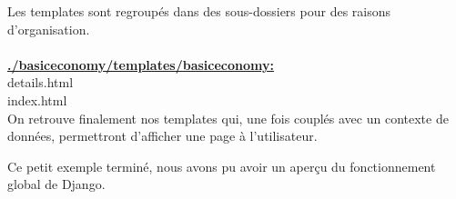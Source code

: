 Les templates sont regroupés dans des sous-dossiers pour des raisons d'organisation.
\\
\\
\underline{\textbf{./basiceconomy/templates/basiceconomy:}} \\
details.html \\
index.html \\

On retrouve finalement nos templates qui,  une fois couplés avec un contexte de données,    permettront d'afficher une page à l'utilisateur.

Ce petit exemple terminé,  nous avons pu avoir un aperçu du fonctionnement global de Django.  